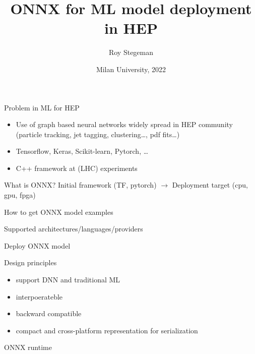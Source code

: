 \documentclass[aspectratio=169,9pt]{beamer}
\title{ONNX for ML model deployment in HEP}
\date{Milan University, 2022}
\author{Roy Stegeman}
\institute{University of Milan and INFN Milan}
\begin{document}
{
\begin{frame}
  \titlepage
\end{frame}
}


\begin{frame}[t]{Problem in ML for HEP}
  \begin{itemize}
    \item Use of graph based neural networks widely spread in HEP community (particle tracking, jet tagging, clustering\ldots, pdf fits\ldots)
    \item Tensorflow, Keras, Scikit-learn, Pytorch, \ldots
    \item C++ framework at (LHC) experiments
  \end{itemize}
\end{frame}

\begin{frame}[t]{What is ONNX?}
  Initial framework (TF, pytorch) $\rightarrow$ Deployment target (cpu, gpu, fpga)
\end{frame}


\begin{frame}[t]{How to get ONNX model}
  examples
\end{frame}

\begin{frame}[t]{Supported architectures/languages/providers}
\end{frame}

\begin{frame}[t]{Deploy ONNX model}
\end{frame}

\begin{frame}[t]{Design principles}
  \begin{itemize}
    \item support DNN and traditional ML
    \item interpoerateble
    \item backward compatible
    \item compact and cross-platform representation for serialization
  \end{itemize}
\end{frame}

\begin{frame}[t]{ONNX runtime}
\end{frame}





\end{document}
